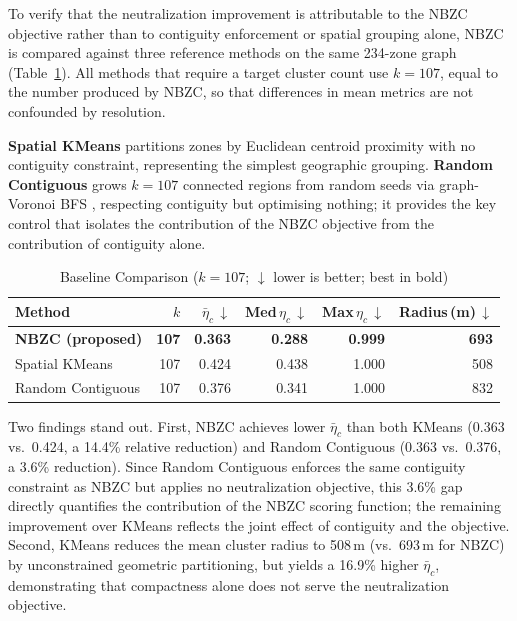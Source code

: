 \documentclass[conference]{IEEEtran}
\begin{document}
To verify that the neutralization improvement is attributable to the
NBZC objective rather than to contiguity enforcement or spatial grouping
alone, NBZC is compared against three reference methods on the same
234-zone graph (Table~\ref{tab:baseline}).
All methods that require a target cluster count use $k=107$, equal to
the number produced by NBZC, so that differences in mean metrics are
not confounded by resolution.

\textbf{Spatial KMeans} \cite{MacQueen1967} partitions zones by
Euclidean centroid proximity with no contiguity constraint, representing
the simplest geographic grouping.
\textbf{Random Contiguous} grows $k=107$ connected regions from random
seeds via graph-Voronoi BFS \cite{Erwig2000}, respecting contiguity but
optimising nothing; it provides the key control that isolates the
contribution of the NBZC objective from the contribution of contiguity
alone.

\begin{table}[t]
\centering
\caption{Baseline Comparison ($k=107$; $\downarrow$ lower is better;
         best in bold)}
\label{tab:baseline}
\scriptsize
\setlength{\tabcolsep}{4pt}
\begin{tabular}{lrrrrr}
\toprule
Method & $k$ & $\bar{\eta}_c$\,$\downarrow$ & Med\,$\eta_c$\,$\downarrow$ & Max\,$\eta_c$\,$\downarrow$ & Radius\,(m)\,$\downarrow$ \\
\midrule
\textbf{NBZC (proposed)} & \textbf{107} & \textbf{0.363} & \textbf{0.288} & \textbf{0.999} & \textbf{693} \\
Spatial KMeans \cite{MacQueen1967} & 107 & 0.424 & 0.438 & 1.000 & 508 \\
Random Contiguous \cite{Erwig2000} & 107 & 0.376 & 0.341 & 1.000 & 832 \\
\bottomrule
\end{tabular}
\end{table}

Two findings stand out.
First, NBZC achieves lower $\bar{\eta}_c$ than both KMeans (0.363 vs.\
0.424, a 14.4\% relative reduction) and Random Contiguous (0.363
vs.\ 0.376, a 3.6\% reduction).
Since Random Contiguous enforces the same contiguity constraint as NBZC
but applies no neutralization objective, this 3.6\% gap directly
quantifies the contribution of the NBZC scoring function; the remaining
improvement over KMeans reflects the joint effect of contiguity and the
objective.
Second, KMeans reduces the mean cluster radius to 508\,m (vs.\ 693\,m
for NBZC) by unconstrained geometric partitioning, but yields a 16.9\%
higher $\bar{\eta}_c$, demonstrating that compactness alone does not
serve the neutralization objective.
\end{document}
